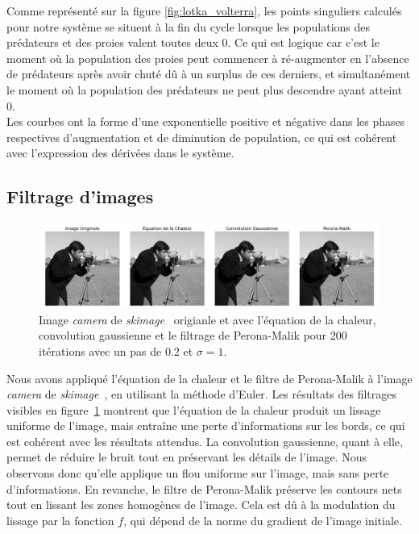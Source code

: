\documentclass{article}
\begin{document}
Comme représenté sur la figure \ref{fig:lotka_volterra}, les points singuliers calculés pour notre système se situent à la fin du cycle lorsque les populations des prédateurs et des proies valent toutes deux 0. Ce qui est logique car c'est le moment où la population des proies peut commencer à ré-augmenter en l'absence de prédateurs après avoir chuté dû à un surplus de ces derniers, et simultanément le moment où la population des prédateurs ne peut plus descendre ayant atteint 0.\\
Les courbes ont la forme d'une exponentielle positive et négative dans les phases respectives d'augmentation et 
de diminution de population, ce qui est cohérent avec l'expression des dérivées dans le système. 

\subsection{Filtrage d'images}
\begin{figure}[H]
  \centering
  \includegraphics[width=\textwidth]{img/all_filters.png}
  \caption{Image \textit{camera} de \textit{skimage}~\cite{scikit-image-camera} origianle et avec l'équation de la chaleur, convolution gaussienne et le filtrage de Perona-Malik pour 200 itérations avec un pas de 0.2 et $\sigma = 1$.}
  \label{fig:all_filters}
\end{figure}
Nous avons appliqué l'équation de la chaleur et le filtre de Perona-Malik à l'image \textit{camera} de \textit{skimage}~\cite{scikit-image-camera}, en utilisant la méthode d'Euler. Les résultats des filtrages visibles en figure~\ref{fig:all_filters} montrent que l'équation de la chaleur produit un lissage uniforme de l'image, mais entraîne une perte d'informations sur les bords, ce qui est cohérent avec les résultats attendus. La convolution gaussienne, quant à elle, permet de réduire le bruit tout en préservant les détails de l'image. Nous observons donc qu'elle applique un flou uniforme sur l'image, mais sans perte d'informations. En revanche, le filtre de Perona-Malik préserve les contours nets tout en lissant les zones homogènes de l'image. Cela est dû à la modulation du lissage par la fonction \( f \), qui dépend de la norme du gradient de l'image initiale.
\end{document}
